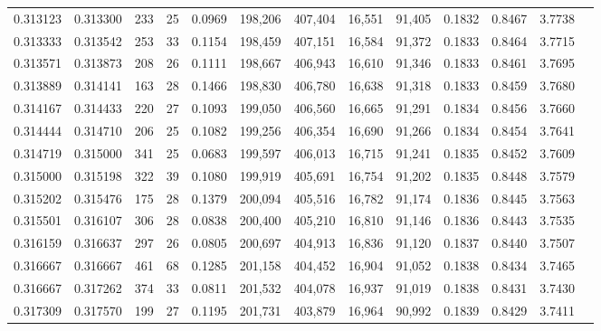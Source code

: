 \begin{tabular}{rrrrrrrrrrrrr}
0.313123 & 0.313300 &    233 &    25 &                                     0.0969 & 198,206 & 407,404 &  16,551 &  91,405 & 0.1832 & 0.8467 & 3.7738 \\
0.313333 & 0.313542 &    253 &    33 &                                     0.1154 & 198,459 & 407,151 &  16,584 &  91,372 & 0.1833 & 0.8464 & 3.7715 \\
0.313571 & 0.313873 &    208 &    26 &                                     0.1111 & 198,667 & 406,943 &  16,610 &  91,346 & 0.1833 & 0.8461 & 3.7695 \\
0.313889 & 0.314141 &    163 &    28 &                                     0.1466 & 198,830 & 406,780 &  16,638 &  91,318 & 0.1833 & 0.8459 & 3.7680 \\
0.314167 & 0.314433 &    220 &    27 &                                     0.1093 & 199,050 & 406,560 &  16,665 &  91,291 & 0.1834 & 0.8456 & 3.7660 \\
0.314444 & 0.314710 &    206 &    25 &                                     0.1082 & 199,256 & 406,354 &  16,690 &  91,266 & 0.1834 & 0.8454 & 3.7641 \\
0.314719 & 0.315000 &    341 &    25 &                                     0.0683 & 199,597 & 406,013 &  16,715 &  91,241 & 0.1835 & 0.8452 & 3.7609 \\
0.315000 & 0.315198 &    322 &    39 &                                     0.1080 & 199,919 & 405,691 &  16,754 &  91,202 & 0.1835 & 0.8448 & 3.7579 \\
0.315202 & 0.315476 &    175 &    28 &                                     0.1379 & 200,094 & 405,516 &  16,782 &  91,174 & 0.1836 & 0.8445 & 3.7563 \\
0.315501 & 0.316107 &    306 &    28 &                                     0.0838 & 200,400 & 405,210 &  16,810 &  91,146 & 0.1836 & 0.8443 & 3.7535 \\
0.316159 & 0.316637 &    297 &    26 &                                     0.0805 & 200,697 & 404,913 &  16,836 &  91,120 & 0.1837 & 0.8440 & 3.7507 \\
0.316667 & 0.316667 &    461 &    68 &                                     0.1285 & 201,158 & 404,452 &  16,904 &  91,052 & 0.1838 & 0.8434 & 3.7465 \\
0.316667 & 0.317262 &    374 &    33 &                                     0.0811 & 201,532 & 404,078 &  16,937 &  91,019 & 0.1838 & 0.8431 & 3.7430 \\
0.317309 & 0.317570 &    199 &    27 &                                     0.1195 & 201,731 & 403,879 &  16,964 &  90,992 & 0.1839 & 0.8429 & 3.7411 \\

\end{tabular}

